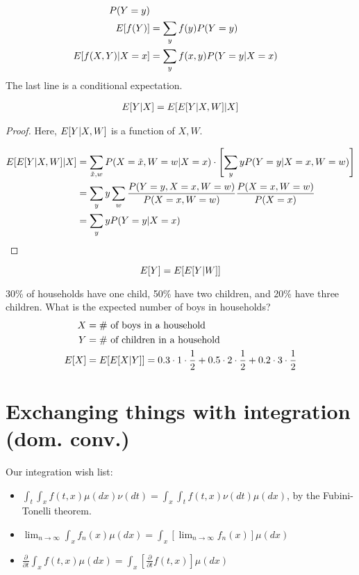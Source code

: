 \documentclass[twoside]{article}
\begin{document}
\begin{align*}
  P(Y = y) \\
  E[f(Y)] &= \sum_y f(y) P(Y = y) \\
  E[f(X, Y) | X = x] &= \sum_y f(x, y) P(Y = y | X = x)
\end{align*}
The last line is a conditional expectation.

\begin{theorem}
\begin{align*}
  E[Y | X] = E[E[Y | X, W] | X]
\end{align*}
\end{theorem}
\begin{proof}
  Here, $E[Y | X, W]$ is a function of $X, W$. 

  \begin{align*}
    E[E[Y | X, W] | X] &= \sum_{\tilde{x}, w} P(X = \tilde{x}, W = w | X = x)
    \cdot \left[ \sum_y yP(Y = y | X = x, W = w)\right] \\
    &= \sum_y y \sum_w \frac{P(Y = y, X = x, W = w)}{P(X = x, W = w)}  \frac{P(X =
    x, W = w)}{P(X = x)} \\
    &= \sum_y y P(Y = y | X = x)
  \end{align*}
\end{proof}
\begin{corollary}
  \[E[Y] = E[E[Y | W]]\]
\end{corollary}

\begin{example}
30\% of households have one child, 50\% have two children, and 20\% have
three children. What is the expected number of boys in households?
\begin{align*}
  X &= \text{\# of boys in a household} \\
  Y &= \text{\# of children in a household} \\
  E[X] &= E[E[X | Y]]= 0.3 \cdot 1 \cdot \frac{1}{2} + 0.5 \cdot 2 \cdot 
  \frac{1}{2} + 0.2 \cdot 3 \cdot \frac{1}{2}
\end{align*}
\end{example}

\section{Exchanging things with integration (dom. conv.)}

Our integration wish list:
\begin{itemize}
  \item $\int_t \int_x f(t, x) \mu(dx) \nu(dt) = \int_x \int_t f(t, x) \nu(dt)
    \mu(dx)$, by the Fubini-Tonelli theorem.
  \item $\lim_{n \rightarrow \infty} \int_x f_n(x) \mu(dx) = \int_x \left[
    \lim_{n \rightarrow \infty} f_n(x) \right] \mu(dx)$
  \item $\frac{\partial}{\partial t} \int_x f(t, x) \mu(dx) = \int_x
    \left[\frac{\partial}{\partial t} f(t, x)\right] \mu(dx)$
\end{itemize}
\end{document}
